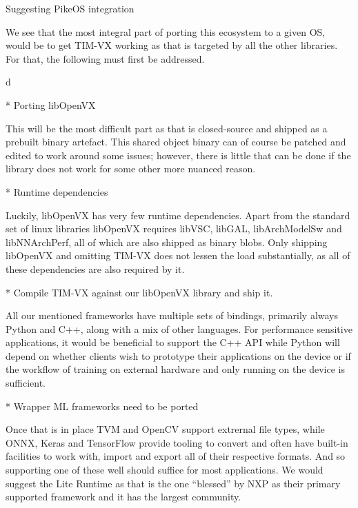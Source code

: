 \chap Suggesting PikeOS integration

We see that the most integral part of
porting this ecosystem to a given OS,
would be to get TIM-VX working as
that is targeted by all the other
libraries.
For that,
the following must first be addressed.

\begitems \style d

* {Porting libOpenVX}

This will be the most difficult part
as that is closed-source and shipped as a prebuilt
binary artefact.
This shared object binary can of course be patched
and edited to work around some issues;
however, there is little that can be done
if the library does not work
for some other more nuanced reason.

* {Runtime dependencies}

Luckily, libOpenVX has very few runtime dependencies.
Apart from the standard set of linux libraries
libOpenVX requires libVSC, libGAL, libArchModelSw and libNNArchPerf,
all of which are also shipped as binary blobs.
Only shipping libOpenVX and omitting TIM-VX
does not lessen the load substantially,
as all of these dependencies are also required by it.

* {Compile TIM-VX against our libOpenVX library and ship it.}

All our mentioned frameworks have multiple sets of bindings,
primarily always Python and C++, along with a mix of other languages.
For performance sensitive applications, it would be beneficial
to support the C++ API while Python will depend on
whether clients wish to prototype their applications
on the device or if the workflow
of training on external hardware and only running on the device
is sufficient.

* {Wrapper ML frameworks need to be ported}

Once that is in place TVM and OpenCV support extrernal
file types,
while ONNX, Keras and TensorFlow
provide tooling to convert and
often have built-in facilities to work with,
import and export
all of their respective formats.
And so supporting one of these well should
suffice for most applications.
We would suggest the Lite Runtime as that is the one ``blessed''
by NXP as their primary supported framework
and it has the largest community.

\enditems


